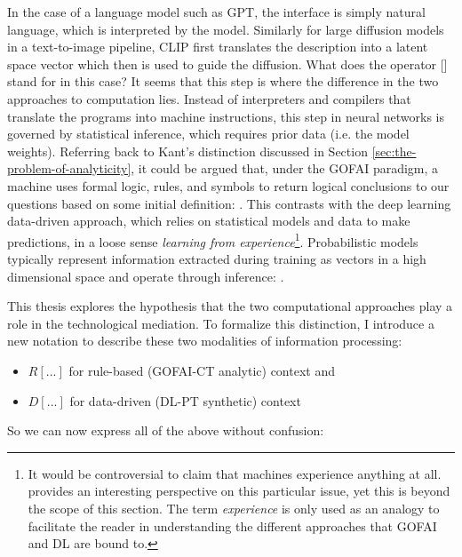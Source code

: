 In the case of a language model such as GPT, the interface is simply natural language, which is interpreted by the model. Similarly for large diffusion models in a text-to-image pipeline, CLIP first translates the description into a latent space vector which then is used to guide the diffusion. What does the operator [] stand for in this case? It seems that this step is where the difference in the two approaches to computation lies. Instead of interpreters and compilers that translate the programs into machine instructions, this step in neural networks is governed by statistical inference, which requires prior data (i.e. the model weights). 
 Referring back to Kant's distinction discussed in Section \ref{sec:the-problem-of-analyticity}, it could be argued that, under the GOFAI paradigm, a machine uses formal logic, rules, and symbols to return logical conclusions to our questions based on some initial definition: . This contrasts with the deep learning data-driven approach, which relies on statistical models and data to make predictions, in a loose sense \emph{learning from experience}\footnote{It would be controversial to claim that  machines experience anything at all. \cite{Colton2020} provides an interesting perspective on this particular issue, yet this is beyond the scope of this section. The term \emph{experience} is only used as an analogy to facilitate the reader in understanding the different approaches that GOFAI and DL are bound to.}. Probabilistic models typically represent information extracted during training as vectors in a high dimensional space and operate through inference: .

This thesis explores the hypothesis that the two computational approaches play a role in the technological mediation. To formalize this distinction, I introduce a new notation to describe these two modalities of information processing: 

 \begin{itemize}
	\singlespacing
	\item $R[...]$ for rule-based (GOFAI-CT analytic) context and
	\item $D[...]$ for data-driven (DL-PT synthetic) context 
 \end{itemize}
 
 So we can now express all of the above without confusion:
 
